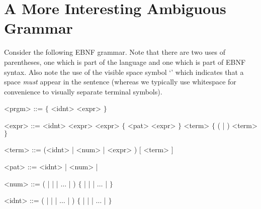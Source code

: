 \documentclass{article}
\theoremstyle{remark} \newtheorem*{solution}{Solution}
\begin{document}
\pagebreak
\section{A More Interesting Ambiguous Grammar}

Consider the following EBNF grammar. Note that there are two uses of
parentheses, one which is part of the language and one which is part
of EBNF syntax.  Also note the use of the visible space symbol
`\textvisiblespace' which indicates that a space \textit{must} appear
in the sentence (whereas we typically use whitespace for convenience to visually separate terminal symbols).

\begin{mdframed}
\begin{grammar}
<prgm> ::= $\{$  <idnt> \lit*{=} <expr> $\}$

<expr> ::=
 <idnt> \lit*{=>} <expr>
\alt {} <expr>  $\{$ \lit*{/} <pat> \lit*{->} <expr> $\}$
\alt <term> $\{$ ( \lit*{+} | \lit*{-} ) <term>$\}$

<term> ::= (<idnt> | <num> | \lit*{(} <expr> \lit*{)}) [ \lit*{\textvisiblespace} <term> ]

<pat> ::= <idnt> | <num> | \lit*{*}

<num> ::= ( |  |  | $\dots$ | ) $\{$  |  |  | $\dots$ |  $\}$

<idnt> ::= ( |  |  | $\dots$ | ) $\{$  |  |  | $\dots$ |  $\}$

\end{grammar}
\end{mdframed}
\end{document}

